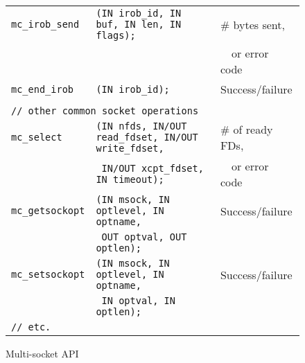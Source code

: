 \documentclass[10pt]{article}
\begin{document}
\begin{figure*}[t]
\begin{small}
\begin{center}
\begin{tabular}{|lll|}
{\tt mc\_irob\_send} & {\tt (IN irob\_id, IN buf, IN len, IN flags);} & \# bytes sent, \\
 & & ~~or error code\\
{\tt mc\_end\_irob} & {\tt (IN irob\_id); }&  Success/failure\\
 & & \\
\multicolumn{3}{|l|}{\tt // other common socket operations} \\
{\tt mc\_select} & {\tt (IN nfds, IN/OUT read\_fdset, IN/OUT write\_fdset, } & \# of ready FDs,\\
                & {\tt ~IN/OUT xcpt\_fdset, IN timeout); } & ~~or error code\\
{\tt mc\_getsockopt} & {\tt (IN msock, IN optlevel, IN optname, } & Success/failure\\
                     & {\tt ~OUT optval, OUT optlen); } & \\
{\tt mc\_setsockopt} & {\tt (IN msock, IN optlevel, IN optname, } & Success/failure\\
                     & {\tt ~IN optval, IN optlen); } & \\
{\tt // etc.} & &\\
\hline
\end{tabular}
\end{center}
\end{small}
\caption{Multi-socket API}
\label{fig:api}
\end{figure*}

~
\end{document}
